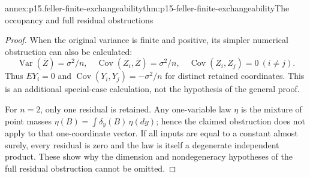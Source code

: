 \begin{annexitem}{annex:p15.feller-finite-exchangeability}{thm:p15-feller-finite-exchangeability}{The occupancy and full residual obstructions}
\begin{proof}
When the original variance is finite and positive, its simpler
numerical obstruction can also be calculated:
\[
 \operatorname{Var}(\overline Z)=\sigma^2/n,\quad
 \operatorname{Cov}(Z_i,\overline Z)=\sigma^2/n,\quad
 \operatorname{Cov}(Z_i,Z_j)=0\ (i\ne j).
\]
Thus \(EY_i=0\) and
\(\operatorname{Cov}(Y_i,Y_j)=-\sigma^2/n\) for distinct retained
coordinates. This is an additional special-case calculation,
not the hypothesis of the general proof.

For \(n=2\), only one residual is retained.
Any one-variable law \(\eta\) is the mixture of point masses
\(\eta(B)=\int\delta_y(B)\,\eta(dy)\); hence the claimed obstruction
does not apply to that one-coordinate vector.
If all inputs are equal to a constant almost surely, every residual
is zero and the law is itself a degenerate independent product.
These show why the dimension and nondegeneracy hypotheses of the
full residual obstruction cannot be omitted.
\end{proof}
\end{annexitem}

